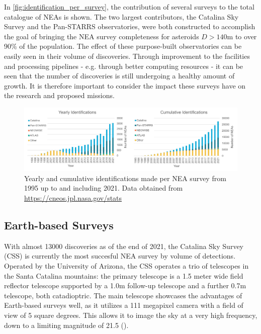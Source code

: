 In \autoref{fig:identification_per_survey}, the contribution of several surveys to the total catalogue of NEAs is shown. The two largest contributors, the Catalina Sky Survey and the Pan-STARRS observatories, were both constructed to accomplish the goal of bringing the NEA survey completeness for asteroids $D > 140 \mathrm{m}$ to over 90\% of the population. The effect of these purpose-built observatories can be easily seen in their volume of discoveries. Through improvement to the facilities and processing pipelines - e.g. through better computing resources - it can be seen that the number of discoveries is still undergoing a healthy amount of growth. It is therefore important to consider the impact these surveys have on the research and proposed missions.

\begin{figure}[htbp]
 \centering
 \includegraphics[width=1.0\textwidth]{img/identification_per_survey.pdf}
 \caption{Yearly and cumulative identifications made per NEA survey from 1995 up to and including 2021. Data obtained from \url{https://cneos.jpl.nasa.gov/stats}}
 \label{fig:identification_per_survey}
\end{figure}


\subsection{Earth-based Surveys}
With almost 13000 discoveries as of the end of 2021, the Catalina Sky Survey (CSS) is currently the most succesful NEA survey by volume of detections. Operated by the University of Arizona, the CSS operates a trio of telescopes in the Santa Catalina mountains: the primary telescope is a 1.5 meter wide field reflector telescope supported by a 1.0m follow-up telescope and a further 0.7m telescope, both catadioptric. The main telescope showcases the advantages of Earth-based surveys well, as it utilizes a 111 megapixel camera with a field of view of 5 square degrees. This allows it to image the sky at a very high frequency, down to a limiting magnitude of 21.5 (\cite{CatalinaSkySurvey}).\\

